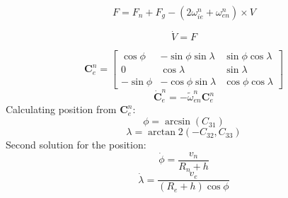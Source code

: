 \[
    F = F_n + F_g - (2\omega_{ie}^n + \omega_{en}^n) \times V
\]

\[
    \dot{V} = F
\]

\[
    \bm{C}_e^n = \begin{bmatrix}
        \cos\phi & -\sin\phi\sin\lambda & \sin\phi\cos\lambda \\
        0 & \cos\lambda & \sin\lambda \\
        -\sin\phi & -\cos\phi\sin\lambda & \cos\phi\cos\lambda
    \end{bmatrix}
\]
\[
    \dot{\bm{C}}_e^n = -\tilde{\omega}_{en}^n\bm{C}_e^n
\]
Calculating position from $\bm{C}_e^n$:
\[
    \phi = \arcsin(C_{31})
\]
\[
    \lambda = \arctan2(-C_{32}, C_{33})
\]
Second solution for the position:
\[
    \dot{\phi} = \dfrac{v_n}{R_n+h}
\]
\[
    \dot{\lambda} = \dfrac{v_e}{(R_e+h)\cos\phi}
\]

